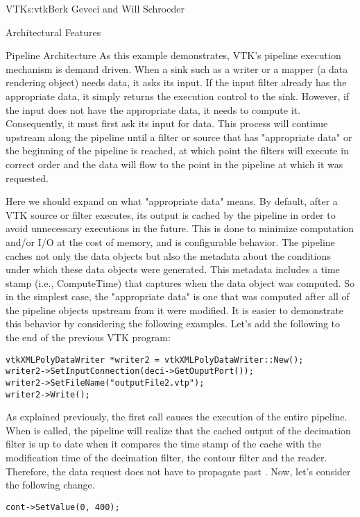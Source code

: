\begin{aosachapter}{VTK}{s:vtk}{Berk Geveci and Will Schroeder}
\begin{aosasect1}{Architectural Features}
\begin{aosasect2}{Pipeline Architecture}
As this example demonstrates, VTK's pipeline execution mechanism is
demand driven. When a sink such as a writer or a mapper (a data
rendering object) needs data, it asks its input. If the input filter
already has the appropriate data, it simply returns the execution
control to the sink. However, if the input does not have the
appropriate data, it needs to compute it. Consequently, it must first
ask its input for data. This process will continue upstream along the
pipeline until a filter or source that has "appropriate data" or the
beginning of the pipeline is reached, at which point the filters will
execute in correct order and the data will flow to the point in the
pipeline at which it was requested.

Here we should expand on what "appropriate data" means. By default,
after a VTK source or filter executes, its output is cached by the
pipeline in order to avoid unnecessary executions in the future. This
is done to minimize computation and/or I/O at the cost of memory, and
is configurable behavior. The pipeline caches not only the data
objects but also the metadata about the conditions under which these
data objects were generated. This metadata includes a time stamp
(i.e., ComputeTime) that captures when the data object was
computed. So in the simplest case, the "appropriate data" is one that
was computed after all of the pipeline objects upstream from it were
modified. It is easier to demonstrate this behavior by considering the
following examples. Let's add the following to the end of the previous
VTK program:

\begin{verbatim}
vtkXMLPolyDataWriter *writer2 = vtkXMLPolyDataWriter::New();
writer2->SetInputConnection(deci->GetOuputPort());
writer2->SetFileName("outputFile2.vtp");
writer2->Write();
\end{verbatim}

As explained previously, the first 
call causes the execution of the entire pipeline. When
 is called, the pipeline will
realize that the cached output of the decimation filter is up to date
when it compares the time stamp of the cache with the modification
time of the decimation filter, the contour filter and the
reader. Therefore, the data request does not have to propagate past
. Now, let's consider the following change.

\begin{verbatim}
cont->SetValue(0, 400);


\end{verbatim}
\end{aosasect2}
\end{aosasect1}
\end{aosachapter}
